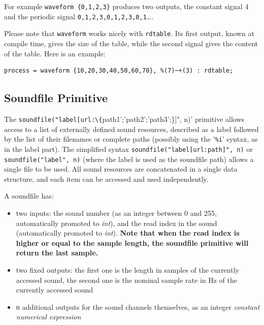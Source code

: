 For example \lstinline'waveform {0,1,2,3}' produces two outputs, the constant signal 4 and the periodic signal \lstinline'0,1,2,3,0,1,2,3,0,1'\ldots.

Please note that \lstinline'waveform' works nicely with \lstinline'rdtable'. Its first output, known at compile time, gives the size of the table, while the second signal gives the content of the table. Here is an example:
\begin{lstlisting}
process = waveform {10,20,30,40,50,60,70}, %(7)~+(3) : rdtable;
\end{lstlisting}

\bigskip

\subsection{Soundfile Primitive}

The \lstinline'soundfile("label[url:\{'path1';'path2';'path3';\}]", n)' primitive allows access to a list of externally defined sound resources, described as a label followed by the list of their filenames or complete paths (possibly using the '\texttt{\%i}' syntax, as in the label part). The simplified syntax \lstinline'soundfile("label[url:path]", n)' or \lstinline'soundfile("label", n)' (where the label is used as the soundfile path) allows a single file to be used. All sound resources are concatenated in a single data structure, and each item can be accessed and used independently.

A soundfile has:

\begin{itemize}
	\item two inputs: the sound number (as an integer between 0 and 255, automatically promoted to \textit{int}), and the read index in the sound (automatically promoted to \textit{int}). \textbf{Note that when the read index is higher or equal to the sample length, the soundfile primitive will return the last sample.}
	\item two fixed outputs: the first one is the length in samples of the currently accessed sound, the second one is the nominal sample rate in Hz of the currently accessed sound
	\item \lstinline'n' additional outputs for the sound channels themselves, as an integer \textit{constant numerical expression}
\end{itemize}

